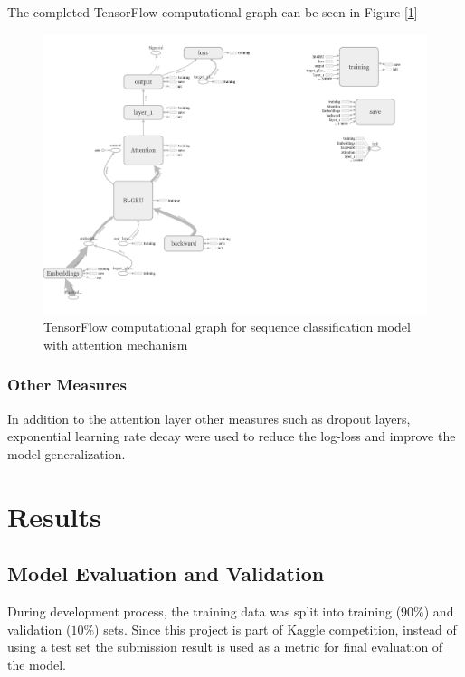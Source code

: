 \documentclass{article}
\begin{document}
    The completed TensorFlow computational graph can be seen in Figure [\ref{fig:tensorflow}]

    \begin{figure}
        \centering
        \includegraphics[scale=0.3]{tensorflow.png}
        \caption{TensorFlow computational graph for sequence classification model with attention mechanism}
        \label{fig:tensorflow}
    \end{figure}

    \subsubsection{Other Measures}

    In addition to the attention layer other measures such as dropout layers, exponential learning rate decay were used to reduce the log-loss and improve the model generalization. 


\section{Results}

    \subsection{Model Evaluation and Validation}

    During development process, the training data was split into training ($90\%$) and validation ($10\%$) sets. Since this project is part of Kaggle competition, instead of using a test set the submission result is used as a metric for final evaluation of the model.
\end{document}
